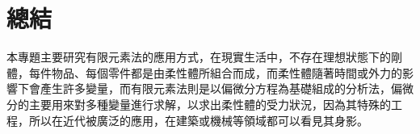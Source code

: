 \chapter{總結}
本專題主要研究有限元素法的應用方式，在現實生活中，不存在理想狀態下的剛體，每件物品、每個零件都是由柔性體所組合而成，而柔性體隨著時間或外力的影響下會產生許多變量，而有限元素法則是以偏微分方程為基礎組成的分析法，偏微分的主要用來對多種變量進行求解，以求出柔性體的受力狀況，因為其特殊的工程，所以在近代被廣泛的應用，在建築或機械等領域都可以看見其身影。

\newpage
